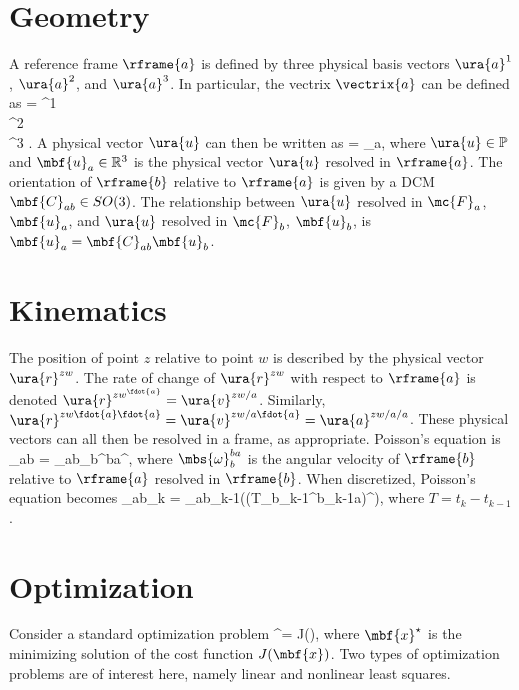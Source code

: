 \section{Geometry}

A reference frame $\rframe{a}$ is defined by three physical basis vectors $\ura{a}^1$, $\ura{a}^2$, and $\ura{a}^3$. In particular, the vectrix $\vectrix{a}$ can be defined as \cite{hughes2012}
\bdis
	 = 
		^1 \\
		^2 \\
		^3
	\ema.
\edis
A physical vector $\ura{u}$ can then be written as
\bdis
	 = _a,
\edis
where $\ura{u} \in \mathbb{P}$ and $\mbf{u}_a \in \mathbb{R}^3$ is the physical vector $\ura{u}$ resolved in $\rframe{a}$. The orientation of $\rframe{b}$ relative to $\rframe{a}$ is given by a DCM $\mbf{C}_{ab} \in SO(3)$. The relationship between $\ura{u}$ resolved in $\mc{F}_a$, $\mbf{u}_a$, and $\ura{u}$ resolved in $\mc{F}_b$, $\mbf{u}_b$, is $\mbf{u}_a = \mbf{C}_{ab} \mbf{u}_b$. 


\section{Kinematics}

The position of point $z$ relative to point $w$ is described by the physical vector $\ura{r}^{zw}$. The rate of change of $\ura{r}^{zw}$ with respect to $\rframe{a}$ is denoted $\ura{r}^{zw ^\fdot{a}} = \ura{v}^{zw/a}$.  Similarly, $\ura{r}^{zw \fdot{a} \fdot{a}} = \ura{v}^{zw/a \fdot{a}} = \ura{a}^{zw/a/a}$. These physical vectors can all then be resolved in a frame, as appropriate.
Poisson's equation is
\bdis
	_{ab} = _{ab}{\mbs{\omega}_b^{ba}}^\times,
\edis
where $\mbs{\omega}_b^{ba}$ is the angular velocity of $\rframe{b}$ relative to $\rframe{a}$ resolved in $\rframe{b}$. When discretized, Poisson's equation becomes
\bdis
	_{ab_k} = _{ab_{k-1}}\exp\left(\left(T\mbs{\omega}_{b_{k-1}}^{b_{k-1}a}\right)^\times\right),
\edis
where $T = t_k - t_{k-1}$.
\section{Optimization}

Consider a standard optimization problem 
\bdis
	^\star =  \; J(),
\edis
where $\mbf{x}^\star$ is the minimizing solution of the cost function $J(\mbf{x})$. Two types of optimization problems are of interest here, namely linear and nonlinear least squares. 
